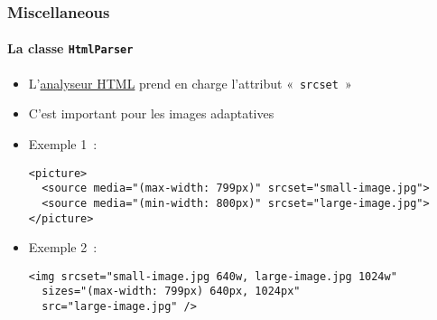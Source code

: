 %

\begin{frame}[fragile]
	\frametitle{Miscellaneous}
	\framesubtitle{La classe \texttt{HtmlParser}}


	\begin{itemize}
		\item L'\href{https://docs.typo3.org/m/typo3/reference-coreapi/master/en-us/ApiOverview/Examples/ParsingHtml/Index.html}{analyseur HTML}
			prend en charge l'attribut «~\texttt{srcset}~»
		\item C'est important pour les images adaptatives
		\item Exemple 1~:
\begin{lstlisting}
<picture>
  <source media="(max-width: 799px)" srcset="small-image.jpg">
  <source media="(min-width: 800px)" srcset="large-image.jpg">
</picture>
\end{lstlisting}
		\item Exemple 2~:
\begin{lstlisting}
<img srcset="small-image.jpg 640w, large-image.jpg 1024w"
  sizes="(max-width: 799px) 640px, 1024px"
  src="large-image.jpg" />
\end{lstlisting}

	\end{itemize}

\end{frame}

